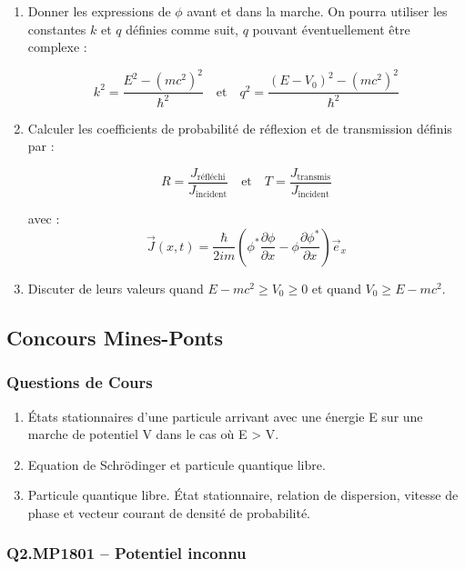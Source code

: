 \begin{enumerate}[resume]
\item Donner les expressions de $\phi$ avant et dans la marche. On pourra utiliser les constantes $k$ et $q$ définies comme suit, $q$ pouvant éventuellement être complexe :

$$k^{2} = \frac{E^{2} - (mc^{2})^{2}}{\hbar^{2}} \quad \text{et} \quad q^{2} = \frac{(E - V_{0})^{2} - (mc^{2})^{2}}{\hbar^{2}}$$

\item Calculer les coefficients de probabilité de réflexion et de transmission définis par :

$$R = \frac{J_{\text{réfléchi}}}{J_{\text{incident}}} \quad \text{et} \quad T = \frac{J_{\text{transmis}}}{J_{\text{incident}}}$$

avec :
$$\vec{J}(x,t) = \frac{\hbar}{2im}\left(\phi^{*}\frac{\partial\phi}{\partial x} - \phi\frac{\partial\phi^{*}}{\partial x}\right)\vec{e}_{x}$$

\item Discuter de leurs valeurs quand $E - mc^{2} \geq V_{0} \geq 0$ et quand $V_{0} \geq E - mc^{2}$.
\end{enumerate}

\newpage
\subsection*{Concours Mines-Ponts}

\subsubsection*{Questions de Cours}
\begin{enumerate}
\item États stationnaires d'une particule arrivant avec une énergie E sur une marche de potentiel V dans le cas où E > V.
\item Equation de Schrödinger et particule quantique libre.
\item Particule quantique libre. État stationnaire, relation de dispersion, vitesse de phase et vecteur courant de densité de probabilité.
\end{enumerate}

\subsubsection*{Q2.MP1801 -- Potentiel inconnu  \corrige}

